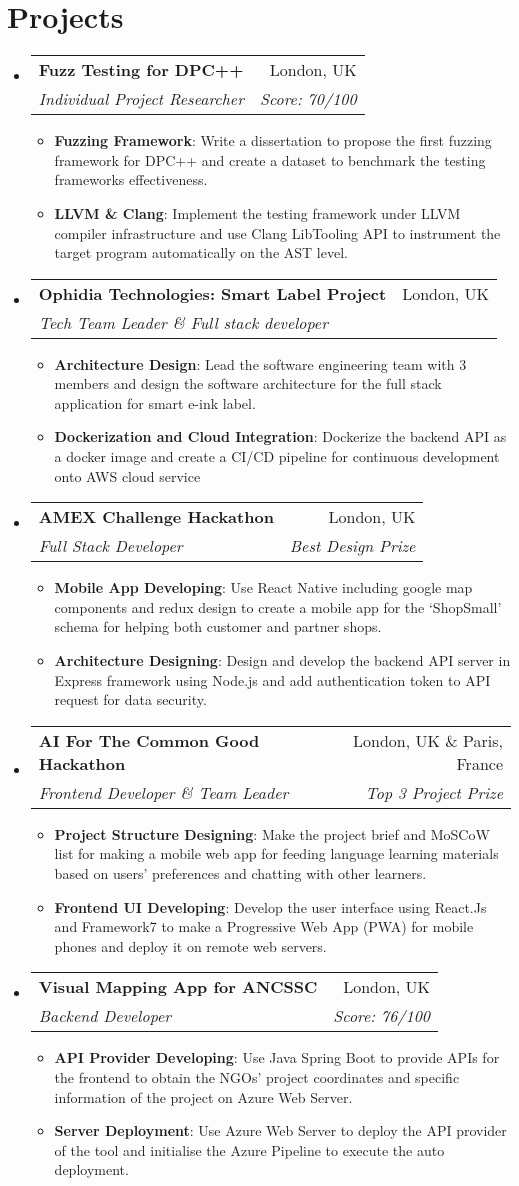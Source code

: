 \documentclass[letterpaper,11pt]{article}
\makeatletter
\newcommand{\resumeItem}[2]{
  \item\small{
    \textbf{#1}{: #2 \vspace{-2pt}}
  }
}
\newcommand{\resumeSubheading}[4]{
  \vspace{-1pt}\item
    \begin{tabular*}{0.97\textwidth}[t]{l@{\extracolsep{\fill}}r}
      \textbf{#1} & #2 \\
      \textit{\small#3} & \textit{\small #4} \\
    \end{tabular*}\vspace{-5pt}
}
\newcommand{\resumeSubHeadingListStart}{\begin{itemize}[leftmargin=*]}
\newcommand{\resumeSubHeadingListEnd}{\end{itemize}}
\newcommand{\resumeItemListStart}{\begin{itemize}[leftmargin=*]}
\newcommand{\resumeItemListEnd}{\end{itemize}\vspace{-5pt}}
\makeatother
\begin{document}
\section{Projects}
  \resumeSubHeadingListStart
    \resumeSubheading
    {Fuzz Testing for DPC++}{London, UK}
    {Individual Project Researcher}{Score: 70/100}
    \resumeItemListStart
      \resumeItem{Fuzzing Framework}
          {Write a dissertation to propose the first fuzzing framework for DPC++ and create a dataset to benchmark the testing frameworks effectiveness.}
      \resumeItem{LLVM \& Clang}
          {Implement the testing framework under LLVM compiler infrastructure and use Clang LibTooling API to instrument the target program automatically on the AST level.}
    \resumeItemListEnd
    \resumeSubheading
    {Ophidia Technologies: Smart Label Project}{London, UK}
    {Tech Team Leader \& Full stack developer}{}
    \resumeItemListStart
      \resumeItem{Architecture Design}
          {Lead the software engineering team with 3 members and design the software architecture for the full stack application for smart e-ink label.}
      \resumeItem{Dockerization and Cloud Integration}
          {Dockerize the backend API as a docker image and create a CI/CD pipeline for continuous development onto AWS cloud service}
    \resumeItemListEnd
    \resumeSubheading
    {AMEX Challenge Hackathon}{London, UK}
    {Full Stack Developer}{Best Design Prize}
    \resumeItemListStart
      \resumeItem{Mobile App Developing}
          {Use React Native including google map components and redux design to create a mobile app 
          for the `ShopSmall' schema for helping both customer and partner shops.}
      \resumeItem{Architecture Designing}
          {Design and develop the backend API server in Express framework using Node.js and 
          add authentication token to API request for data security.}
    \resumeItemListEnd

    \resumeSubheading
    {AI For The Common Good Hackathon}{London, UK \& Paris, France}
    {Frontend Developer \& Team Leader}{Top 3 Project Prize}
    \resumeItemListStart
      \resumeItem{Project Structure Designing}
          {Make the project brief and MoSCoW list for making a mobile web app for feeding language learning materials based on users' preferences and chatting with other learners.}
      \resumeItem{Frontend UI Developing}
          {Develop the user interface using React.Js and Framework7
          to make a Progressive Web App (PWA) for mobile phones and deploy it on remote web servers.}
    \resumeItemListEnd

    \resumeSubheading
    {Visual Mapping App for ANCSSC}{London, UK}
    {Backend Developer}{Score: 76/100}
    \resumeItemListStart
      \resumeItem{API Provider Developing}
          {Use Java Spring Boot to provide APIs for the frontend to obtain the NGOs' project coordinates and 
          specific information of the project on Azure Web Server.}
      \resumeItem{Server Deployment}
          {Use Azure Web Server to deploy the API provider of the tool and initialise the Azure Pipeline to
           execute the auto deployment.}
    \resumeItemListEnd
  \resumeSubHeadingListEnd

\end{document}
